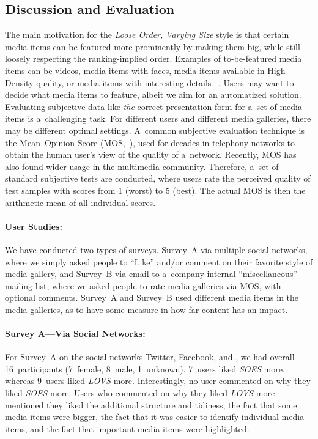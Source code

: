 \subsection{Discussion and Evaluation}
\label{sec:user-studies}

The main motivation for the \emph{Loose Order, Varying Size} style
is that certain media items can be featured more prominently
by making them big, while still loosely respecting the ranking-implied order.
Examples of to-be-featured media items can be videos,
media items with faces, media items available in High-Density quality,
or media items with interesting details~%
\cite{suh2003thumbnail}.
Users may want to decide what media items to feature,
albeit we aim for an automatized solution.
Evaluating subjective data like \emph{the} correct presentation form
for a~set of media items is a~challenging task.
For different users and different media galleries,
there may be different optimal settings.
A~common subjective evaluation technique
is the Mean~Opinion Score (MOS,~\cite{itu1998mos}),
used for decades in telephony networks to
obtain the human user's view of the quality of a~network.
Recently, MOS has also found wider usage in the multimedia community.
Therefore, a~set of standard subjective tests are conducted,
where users rate the perceived quality of test samples
with scores from 1 (worst) to 5 (best).
The actual MOS is then the arithmetic mean of all individual scores.

\paragraph{User Studies:}

We have conducted two types of surveys. 
Survey~A via multiple social networks, where we simply asked people to ``Like''
and/or comment on their favorite style of media gallery,
and Survey~B via email to a~company-internal ``miscellaneous'' mailing list,
where we asked people to rate media galleries via MOS, with optional comments. 
Survey~A and Survey~B used different media items in the media galleries,
as to have some measure in how far content has an impact.

\paragraph{Survey A---Via Social Networks:}

For Survey~A on the social networks Twitter, Facebook,
and \googleplus, we had overall 16~participants (7~female, 8~male, 1~unknown).
7~users liked \emph{SOES} more,
whereas 9~users liked \emph{LOVS} more.
Interestingly, no user commented on why they liked \emph{SOES} more.
Users who commented on why they liked \emph{LOVS} more mentioned
they liked the additional structure and tidiness,
the fact that some media items were bigger,
the fact that it was easier to identify individual media items,
and the fact that important media items were highlighted.

